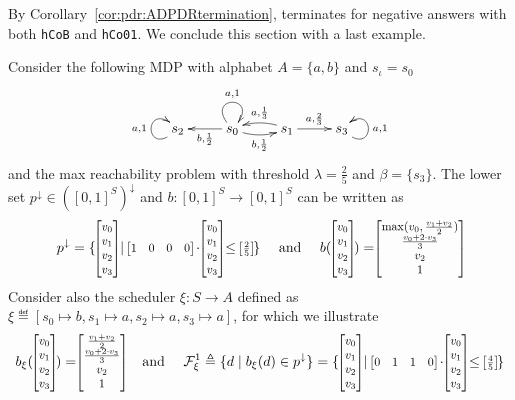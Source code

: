 By Corollary~\ref{cor:pdr:ADPDRtermination}, {\ADPDR} terminates for negative answers with both \verb|hCoB| and \verb|hCo01|. We conclude this section with a last example.
\begin{example}\label{ex:pdr:MDPpositive}
	Consider the following MDP with alphabet $A=\{a,b\}$ and $s_\iota=s_0$
	\begin{displaymath}
		\xymatrix{  s_2 \ar@(ld,lu)^{a, 1} & s_0 \ar@(lu,ru)^{a, 1} \ar[l]^{b, \frac{1}{2}} \ar@/_1ex/[r]_{b, \frac{1}{2}} &s_1 \ar@/_1ex/[l]_{a, \frac{1}{3}} \ar[r]^{a, \frac{2}{3}} &s_3 \ar@(rd,ru)_{a, 1}    }
	\end{displaymath}
	and the max reachability problem with threshold $\lambda = \frac{2}{5}$ and $\beta=\{s_3\}$.
	The lower set $p^\downarrow \in ([0,1]^S)^\downarrow$ and $b\colon [0,1]^S \to [0,1]^S$ can be written as
	\[
	p^\downarrow = \{\,\cvec{v_0}{v_1}{v_2}{v_3} \mid {\scalebox{\vecscale}{$ \!\begin{bmatrix} 1 & 0 & 0 &0 \end{bmatrix}\!$}} \cdot \cvec{v_0}{v_1}{v_2}{v_3} \leq {\scalebox{\vecscale}{$ \!\begin{bmatrix} \frac{2}{5}  \end{bmatrix}\!$} } \}
	\quad \text{ and }  \quad
	b (\, \cvec{v_0}{v_1}{v_2}{v_3} \,) =\cvec{\max(v_0, \frac{v_1+v_2}{2})}{\frac{v_0+2\cdot v_3}{3}}{v_2}{1}
	\]
	Consider also the scheduler $\xi\colon S \to A$ defined as $\xi \eqdef [s_0\mapsto b,s_1\mapsto a,s_2\mapsto a,s_3\mapsto a]$, for which we illustrate
	\begin{equation}\label{eq:pdr:xi}
		b_\xi (\, \cvec{v_0}{v_1}{v_2}{v_3} \,) =\cvec{\frac{v_1+v_2}{2}}{\frac{v_0+2\cdot v_3}{3}}{v_2}{1}
		\quad \text{ and }  \quad
		\mathcal{F}^1_\xi \eqdef \{ d \mid b_\xi(d ) \in p^\downarrow \} = \{\,\cvec{v_0}{v_1}{v_2}{v_3} \mid {\scalebox{\vecscale}{$ \!\begin{bmatrix} 0 & 1 & 1 &0 \end{bmatrix}\!$}}\cdot \cvec{v_0}{v_1}{v_2}{v_3} \leq {\scalebox{\vecscale}{$ \!\begin{bmatrix} \frac{4}{5}  \end{bmatrix}\!$} } \}
	\end{equation}


\end{example}

